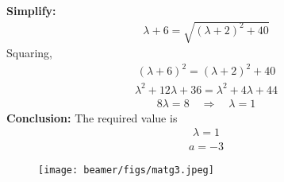 \documentclass[journal]{IEEEtran}
\begin{document}
\textbf{Simplify:}
\begin{align}
\lambda+6 = \sqrt{(\lambda+2)^2+40}
\end{align}
Squaring,
\begin{align}
(\lambda+6)^2 = (\lambda+2)^2+40
\end{align}
\begin{align}
\lambda^2+12\lambda+36 = \lambda^2+4\lambda+44
\end{align}
\begin{align}
8\lambda = 8 \quad \Rightarrow \quad \lambda = 1
\end{align}
\textbf{Conclusion:}  
The required value is
\begin{align}
\boxed{\lambda=1}
\end{align}
\begin{align}
\boxed{\,a = -3\,}
\end{align}
\newpage
\begin{figure}
    \centering
\texttt{[image: beamer/figs/matg3.jpeg]}
    \caption{}
    \label{fig:placeholder}
\end{figure}
\end{document}
